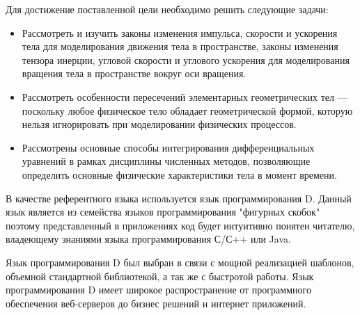 Для достижение поставленной цели необходимо решить следующие задачи:
\begin{itemize}

  \item Рассмотреть и изучить законы изменения импульса, скорости и ускорения тела для моделирования
  движения тела в пространстве, законы изменения тензора инерции, угловой скорости и углового ускорения 
  для моделирования вращения тела в пространстве вокруг оси вращения.

  \item Рассмотреть особенности пересечений элементарных геометрических тел --- поскольку любое физическое тело обладает 
  геометрической формой, которую нельзя игнорировать при моделировании физических процессов.

  \item Рассмотрены основные способы интегрирования дифференциальных уравнений в рамках дисциплины численных методов, 
  позволяющие определить основные физические характеристики тела в момент времени.
\end{itemize}


В качестве референтного языка используется язык программирования D.
Данный язык является из семейства языков программирования "фигурных скобок"
поэтому представленный в приложениях код будет интуитивно понятен читателю,
владеющему знаниями языка программирования С/С++ или Java.

Язык программирования D был выбран в связи с мощной реализацией шаблонов,
объемной стандартной библиотекой, а так же с быстротой работы.
Язык программирования D имеет широкое распространение от программного обеспечения веб-серверов
до бизнес решений и интернет приложений.